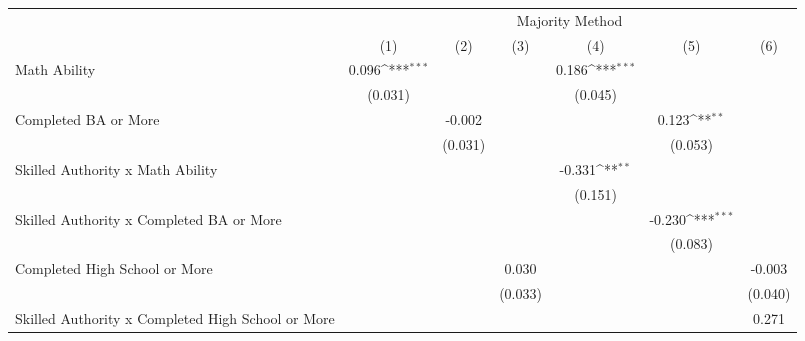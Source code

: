 \documentclass[]{article}
\begin{document}
\begin{table}
\begin{adjustbox}{width=\columnwidth,center}

{
\def\sym#1{\ifmmode^{#1}\else\(^{#1}\)\fi}
\begin{tabular}{l*{6}{c}}
\hline\hline
                &\multicolumn{6}{c}{Majority Method}                                                                              \\\cmidrule(lr){2-7}
                &\multicolumn{1}{c}{(1)}         &\multicolumn{1}{c}{(2)}         &\multicolumn{1}{c}{(3)}         &\multicolumn{1}{c}{(4)}         &\multicolumn{1}{c}{(5)}         &\multicolumn{1}{c}{(6)}         \\
\hline
Math Ability    &    0.096\sym{***}&                  &                  &    0.186\sym{***}&                  &                  \\
                &  (0.031)         &                  &                  &  (0.045)         &                  &                  \\
[1em]
Completed BA or More&                  &   -0.002         &                  &                  &    0.123\sym{**} &                  \\
                &                  &  (0.031)         &                  &                  &  (0.053)         &                  \\
[1em]
Skilled Authority x Math Ability&                  &                  &                  &   -0.331\sym{**} &                  &                  \\
                &                  &                  &                  &  (0.151)         &                  &                  \\
[1em]
Skilled Authority x Completed BA or More&                  &                  &                  &                  &   -0.230\sym{***}&                  \\
                &                  &                  &                  &                  &  (0.083)         &                  \\
[1em]
Completed High School or More&                  &                  &    0.030         &                  &                  &   -0.003         \\
                &                  &                  &  (0.033)         &                  &                  &  (0.040)         \\
[1em]
Skilled Authority x Completed High School or More&                  &                  &                  &                  &                  &    0.271         \\

\end{tabular}}
\end{adjustbox}
\end{table}
\end{document}
